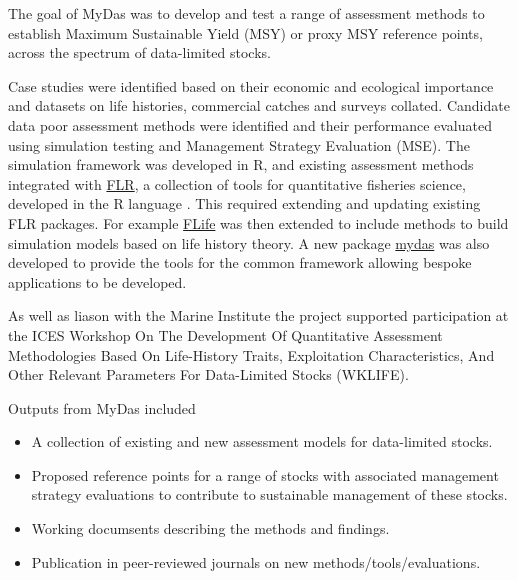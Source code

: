 The goal of MyDas was to develop and test a range of assessment methods to establish Maximum Sustainable Yield (MSY) or proxy MSY reference points, across the spectrum of data-limited stocks. 

Case studies were identified based on their economic and ecological importance and datasets on life histories, commercial catches and surveys collated. Candidate data poor assessment methods were identified and their performance evaluated using simulation testing and Management Strategy Evaluation (MSE).  The simulation framework was developed in R, and existing assessment methods integrated with \href{http://www.flr-project.org/}{FLR}, a collection of tools for quantitative fisheries science, developed in the R language \citep{kell2007flr}. This required extending and updating existing FLR packages. For example \href{https://github.com/flr/flife}{FLife} was then extended to include methods to build simulation models based on life history theory. A new package \href{https://github.com/flr/mydas/wiki}{mydas} was also developed to provide the tools for the common framework allowing bespoke applications to be developed.
 

As well as liason with the Marine Institute the project supported participation at the ICES Workshop On The Development Of Quantitative Assessment Methodologies Based On Life-History Traits, Exploitation Characteristics, And Other Relevant Parameters For Data-Limited Stocks (WKLIFE).



Outputs from MyDas included

\begin{itemize}[noitemsep,topsep=0pt,parsep=0pt,partopsep=0pt]
 \item A collection of existing and new assessment models for data-limited stocks. 
 \item Proposed reference points for a range of stocks with associated management strategy evaluations to contribute to sustainable management of these stocks.
 \item Working documsents describing the methods and findings.
 \item Publication in peer-reviewed journals on new methods/tools/evaluations.
\end{itemize}


